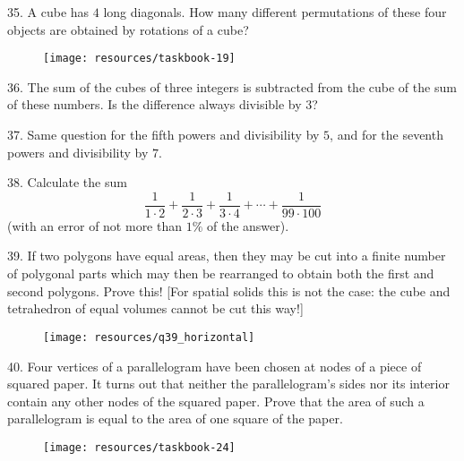 \begin{problem}{35.}
A cube has $4$ long diagonals. How many different permutations of these four objects are obtained by rotations of a cube?
\begin{figure}
	\texttt{[image: resources/taskbook-19]}
\end{figure}
\end{problem}

\begin{problem}{36.}
The sum of the cubes of three integers is subtracted from the cube of the sum of these numbers. Is the difference always divisible by $3$?
\end{problem}

\begin{problem}{37.}
Same question for the fifth powers and divisibility by $5$, and for the seventh powers and divisibility by $7$.
\end{problem}

\begin{problem}{38.}
Calculate the sum
\begin{equation*}
	\frac{1}{1\cdot 2} + \frac{1}{2\cdot 3} + \frac{1}{3\cdot 4} + \dotsb + \frac{1}{99\cdot 100}
\end{equation*}
(with an error of not more than $1\%$ of the answer).
\end{problem}

\begin{problem}{39.}
If two polygons have equal areas, then they may be cut into a finite number of polygonal parts which may then be rearranged to obtain both the first and second polygons. Prove this! [For spatial solids this is not the case: the cube and tetrahedron of equal volumes cannot be cut this way!]
\begin{figure}
	\texttt{[image: resources/q39\_horizontal]}
\end{figure}
\end{problem}

\begin{problem}{40.}
Four vertices of a parallelogram have been chosen at nodes of a piece of squared paper. It turns out that neither the parallelogram's sides nor its interior contain any other nodes of the squared paper. Prove that the area of such a parallelogram is equal to the area of one square of the paper.
\begin{figure}
	\texttt{[image: resources/taskbook-24]}
\end{figure}
\end{problem}

